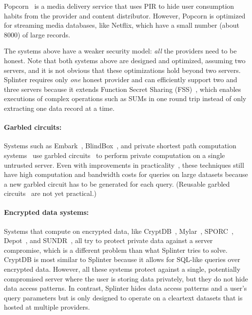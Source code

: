 Popcorn~\cite{popcorn} is a media delivery service that 
uses PIR to hide user consumption habits from the provider
and content distributor. However, Popcorn is optimized for
streaming media databases, like Netflix, which have a small number (about 8000)
of large records. 

The systems above have a weaker
security model: \textit{all} the providers need to be honest.
Note that both systems above are designed and optimized, assuming
two servers, and it is not obvious that these optimizations hold beyond two servers.
Splinter requires only \textit{one} honest provider and can efficiently support
two and three servers because it 
extends Function Secret Sharing (FSS)~\cite{fss,gilboa2014distributed}, which 
enables executions of complex operations such as SUMs in one round trip
instead of only extracting one data record at a time.

\paragraph{Garbled circuits:}
Systems such as Embark~\cite{lan2016embark}, BlindBox~\cite{blindbox}, 
and private shortest path computation systems~\cite{wu2016}
use garbled circuits~\cite{Yao, goldwasser1997multi} to perform private computation
on a single untrusted server.
Even with improvements in practicality~\cite{bellare2013efficient}, these
techniques still have high computation and bandwidth costs for queries on
large datasets because a new garbled circuit has to be generated for each query.
(Reusable garbled circuits~\cite{goldwasser:sfe} are not yet practical.)

\paragraph{Encrypted data systems:}
Systems that compute on encrypted data, like 
CryptDB~\cite{popa:cryptdb}, Mylar~\cite{popa:mylar}, SPORC~\cite{feldman:sporc},
Depot~\cite{mahajan:depot}, and SUNDR~\cite{li:sundr}, all try to protect
private data against a server compromise, which is a different
problem than what Splinter tries to solve. CryptDB is most similar to Splinter 
because it allows for SQL-like queries over encrypted data. However, all
these systems protect against a single, potentially compromised server 
where the user is storing data privately, but they do not hide data access patterns. 
In contrast, Splinter hides data access patterns and a user's query parameters 
but is only designed to operate on a cleartext 
datasets that is hosted at multiple providers.


